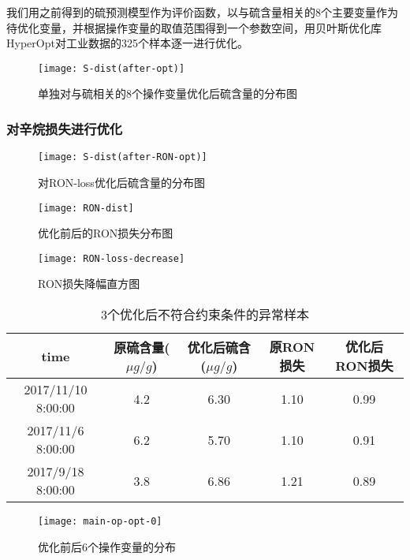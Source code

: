 \documentclass[bwprint]{gmcmthesis}
\begin{document}
我们用之前得到的硫预测模型作为评价函数，以与硫含量相关的8个主要变量作为待优化变量，并根据操作变量的取值范围得到一个参数空间，用贝叶斯优化库HyperOpt对工业数据的325个样本逐一进行优化。



\begin{figure}[htb]
	\centering
	\texttt{[image: S-dist(after-opt)]}
	\caption{单独对与硫相关的8个操作变量优化后硫含量的分布图}
\end{figure}




\FloatBarrier
\subsubsection{对辛烷损失进行优化}

\begin{figure}[htb]
	\centering
	\texttt{[image: S-dist(after-RON-opt)]}
	\caption{对RON-loss优化后硫含量的分布图}
\end{figure}

\begin{figure}[htb]
	\centering
	\texttt{[image: RON-dist]}
	\caption{优化前后的RON损失分布图}
\end{figure}




\begin{figure}[htb]
	\centering
	\texttt{[image: RON-loss-decrease]}
	\caption{RON损失降幅直方图}
\end{figure}

\begin{table}[htb]
	\caption{3个优化后不符合约束条件的异常样本}\label{tab:004} \centering
	\begin{tabular}{ccccc}
		\toprule[1.5pt]
	 time &  原硫含量($\mu g/g$) &  优化后硫含($\mu g/g$) &  原RON损失 &  优化后RON损失 \\
		\midrule[1pt]
2017/11/10 8:00:00 &              4.2 &               6.30 &    1.10 &      0.99 \\
2017/11/6 8:00:00 &              6.2 &               5.70 &    1.10 &      0.91 \\
2017/9/18 8:00:00 &              3.8 &               6.86 &    1.21 &      0.89 \\  
		\bottomrule[1.5pt]
	\end{tabular}
\end{table}

\begin{figure}[htb]
	\centering
	\texttt{[image: main-op-opt-0]}
	\caption{优化前后6个操作变量的分布}
\end{figure}
\end{document}
